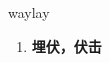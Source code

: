 
\begin{frame}
{\huge waylay}
\begin{center}
\begin{enumerate}\Large
  \item \textbf{埋伏，伏击}
\end{enumerate}
\end{center}
\end{frame}
